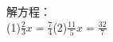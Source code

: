 
解方程：\\
(1)$\frac{2}{3} x=\frac{7}{4}$\hspace{12em}(2)$\frac{11}{5} x=\frac{32}{7}$\hspace{12em}\\

